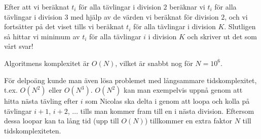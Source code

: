 Efter att vi beräknat $t_i$ för alla tävlingar i division $2$ beräknar vi $t_i$ för alla tävlingar i division $3$ med hjälp av de värden vi beräknat för division $2$, och vi fortsätter på det viset tills vi beräknat $t_i$ för alla tävlingar i division $K$. Slutligen så hittar vi minimum av $t_i$ för alla tävlingar $i$ i division $K$ och skriver ut det som vårt svar!

Algoritmens komplexitet är $O(N)$, vilket är snabbt nog för $N = 10^6$.

För delpoäng kunde man även lösa problemet med långsammare tidskomplexitet, t.ex. $O(N^2)$ eller $O(N^3)$.
$O(N^2)$ kan man exempelvis uppnå genom att hitta nästa tävling efter $i$ som Nicolas ska delta i genom att loopa och kolla på tävlingar $i+1$, $i+2$, $\dots$ tills man kommer fram till en i nästa division.
Eftersom dessa loopar kan ta lång tid (upp till $O(N)$) tillkommer en extra faktor $N$ till tidskomplexiteten.
